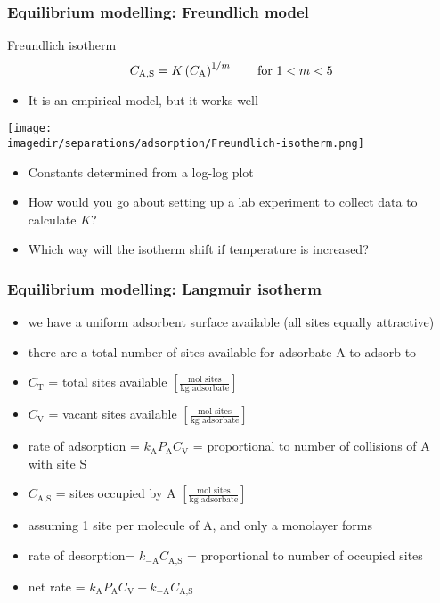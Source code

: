 \begin{frame}\frametitle{Equilibrium modelling: Freundlich model}
	\begin{exampleblock}{Freundlich isotherm}
		\[C_\text{A,S} = K \left(C_\text{A}\right)^{1/m}\qquad \text{for $ 1 < m < 5$}\]
	\end{exampleblock}

	\vspace{12pt}
	\begin{itemize}
		\item	It is an empirical model, but it works well
	\end{itemize}
	\begin{center}
		\texttt{[image: \\imagedir/separations/adsorption/Freundlich-isotherm.png]}
	\end{center}

	\begin{itemize}
		\item	Constants determined from a log-log plot
		\item	How would you go about setting up a lab experiment to collect data to calculate $K$?
		\item	Which way will the isotherm shift if temperature is increased?
	\end{itemize}
\end{frame}

\begin{frame}\frametitle{Equilibrium modelling: Langmuir isotherm}
	\begin{itemize}
		\item	we have a uniform adsorbent surface available {\tiny (all sites equally attractive)}
		\item	there are a total number of sites available for adsorbate A to adsorb to
		\item	$C_\text{T}$ = total sites available \hfill {\scriptsize $\left[\displaystyle\frac{\text{mol sites}}{\text{kg adsorbate}} \right]$}
		\pause
		\item	$C_\text{V}$ = vacant sites available \hfill {\scriptsize $\left[\displaystyle\frac{\text{mol sites}}{\text{kg adsorbate}} \right]$}
		\item	rate of adsorption = $k_\text{A} P_\text{A} C_\text{V}$ = proportional to number of collisions of A with site S
		\pause
		\item	$C_\text{A,S}$ = sites occupied by A \hfill {\scriptsize $\left[\displaystyle\frac{\text{mol sites}}{\text{kg adsorbate}} \right]$}
		\item	assuming 1 site per molecule of A, and only a monolayer forms
		\item	rate of desorption=  $k_{-\text{A}} C_\text{A,S}$ = proportional to number of occupied sites
		\item	net rate = $k_\text{A} P_\text{A} C_\text{V} - k_{-\text{A}} C_\text{A,S}$
	\end{itemize}
\end{frame}

